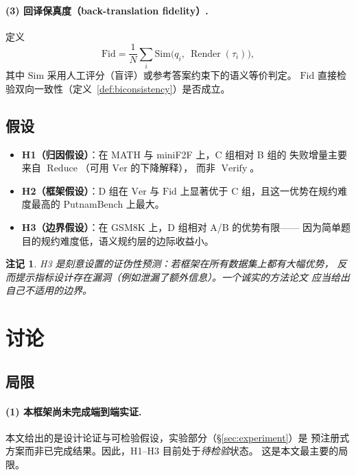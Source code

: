 \documentclass[UTF8,a4paper,11pt]{ctexart}
\newtheorem{remark}{注记}[section]
\DeclareMathOperator{\Verify}{Verify}
\DeclareMathOperator{\Reduce}{Reduce}
\DeclareMathOperator{\Render}{Render}
\begin{document}
\paragraph{(3) 回译保真度（back-translation fidelity）.}
定义
\begin{equation}\label{eq:fidelity}
  \mathrm{Fid} = \frac{1}{N}\sum_{i}
     \mathrm{Sim}\!\big(q_i,\ \Render(\tau_i)\big),
\end{equation}
其中 $\mathrm{Sim}$ 采用人工评分（盲评）或参考答案约束下的语义等价判定。
$\mathrm{Fid}$ 直接检验双向一致性（定义~\ref{def:biconsistency}）是否成立。

\subsection{假设}

\begin{itemize}[leftmargin=1.6em,itemsep=2pt]
  \item \textbf{H1（归因假设）}：在 MATH 与 miniF2F 上，C 组相对 B 组的
        失败增量主要来自 $\Reduce$（可用 $\mathrm{Ver}$ 的下降解释），
        而非 $\Verify$。
  \item \textbf{H2（框架假设）}：D 组在 $\mathrm{Ver}$ 与 $\mathrm{Fid}$
        上显著优于 C 组，且这一优势在规约难度最高的 PutnamBench 上最大。
  \item \textbf{H3（边界假设）}：在 GSM8K 上，D 组相对 A/B 的优势有限——
        因为简单题目的规约难度低，语义规约层的边际收益小。
\end{itemize}

\begin{remark}
H3 是刻意设置的\emph{证伪性}预测：若框架在所有数据集上都有大幅优势，
反而提示指标设计存在漏洞（例如泄漏了额外信息）。一个诚实的方法论文
应当给出自己\emph{不}适用的边界。
\end{remark}

\section{讨论}\label{sec:discussion}

\subsection{局限}

\paragraph{(1) 本框架尚未完成端到端实证.}
本文给出的是设计论证与可检验假设，实验部分（\S\ref{sec:experiment}）是
预注册式方案而非已完成结果。因此，H1--H3 目前处于\emph{待检验}状态。
这是本文最主要的局限。
\end{document}
